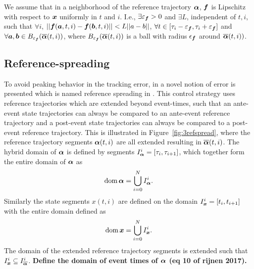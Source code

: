 \documentclass[../DC2017114Bouma.tex]{subfiles}
\begin{document}
\begin{myass}
We assume that in a neighborhood of the reference trajectory $\boldsymbol{\alpha}$, ${\boldsymbol{f}}$ is Lipschitz with respect to ${\boldsymbol{x}}$ uniformly in $t$ and $i$. I.e., $\exists\varepsilon_{{\boldsymbol{f}}}>0$ and $\exists L$, independent of $t,i$, such that $\forall i$, $||{\boldsymbol{f}}({\boldsymbol{a}},t,i) - {\boldsymbol{f}}({\boldsymbol{b}},t,i)||<L||a-b||$, $\forall t\in [\tau_i - \varepsilon_{{\boldsymbol{f}}},\tau_i + \varepsilon_{{\boldsymbol{f}}}]$ and $\forall {\boldsymbol{a}},{\boldsymbol{b}}\in B_{\varepsilon_{{\boldsymbol{f}}}}(\overline{\boldsymbol{\alpha}}(t,i))$, where $B_{\varepsilon_{{\boldsymbol{f}}}}(\overline{\boldsymbol{\alpha}}(t,i))$ is a ball with radius $\epsilon_{{\boldsymbol{f}}}$ around $\overline{\boldsymbol{\alpha}}(t,i))$.
\end{myass}


%
%
%
%
%
\subsection{Reference-spreading}
To avoid peaking behavior in the tracking error, in \cite{Saccon2014} a novel notion of error is presented which is named reference spreading in \cite{Rijnen2016}. This control strategy uses reference trajectories which are extended beyond event-times, such that an ante-event state trajectories can always be compared to an ante-event reference trajectory and a post-event state trajectories can always be compared to a post-event reference trajectory. This is illustrated in Figure~\ref{fig:3refspread}, where the reference trajectory segments $\boldsymbol{\alpha}(t,i)$ are all extended resulting in $\overline{\boldsymbol{\alpha}}(t,i)$. The hybrid domain \cite{Goebel2009} of $\boldsymbol{\alpha}$ is defined by segments $I^i_{\boldsymbol{\alpha}} = [\tau_i,\tau_{i+1}]$, which together form the entire domain of $\boldsymbol{\alpha}$ as
\begin{align}
\operatorname{\textnormal{dom}}\boldsymbol{\alpha} = \bigcup^N_{i=0}I_{\boldsymbol{\alpha}}^i.
\end{align}
%
Similarly the state segments $x(t,i)$ are defined on the domain $I^i_{\boldsymbol{x}} = [t_i,t_{i+1}]$ with the entire domain defined as
\begin{align}
\operatorname{\textnormal{dom}}{\boldsymbol{x}} = \bigcup^N_{i=0}I_{{\boldsymbol{x}}}^i.
\end{align}
The domain of the extended reference trajectory segments is extended such that $I_{{\boldsymbol{x}}}^i\subseteq I_{\overline{\boldsymbol{\alpha}}}^i$. \textbf{Define the domain of event times of $\boldsymbol{\alpha}$ (eq 10 of rijnen 2017).}
\end{document}
